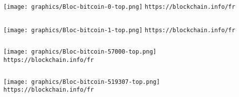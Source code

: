 

\begin{frame}{}

\begin{columns}
\column{\dimexpr\paperwidth-1pt}

\begin{center}
\vskip 1.0cm
\texttt{[image: graphics/Bloc-bitcoin-0-top.png]}
\vskip 0.1cm
{\tiny\texttt{https://blockchain.info/fr}}
\end{center}

\end{columns}

\normalsize
\end{frame}


\begin{frame}{}

\begin{columns}
\column{\dimexpr\paperwidth-1pt}

\begin{center}
\vskip 1.0cm
\texttt{[image: graphics/Bloc-bitcoin-1-top.png]}
\vskip 0.1cm
{\tiny\texttt{https://blockchain.info/fr}}
\end{center}

\end{columns}

\normalsize
\end{frame}


\begin{frame}{}

\begin{columns}
\column{\dimexpr\paperwidth-1pt}

\begin{center}
\vskip 1.0cm
\texttt{[image: graphics/Bloc-bitcoin-57000-top.png]}
\vskip 0.1cm
{\tiny\texttt{https://blockchain.info/fr}}
\end{center}

\end{columns}

\normalsize
\end{frame}


\begin{frame}{}

\begin{columns}
\column{\dimexpr\paperwidth-1pt}

\begin{center}
\vskip 1.0cm
\texttt{[image: graphics/Bloc-bitcoin-519307-top.png]}
\vskip 0.1cm
{\tiny\texttt{https://blockchain.info/fr}}
\end{center}

\end{columns}

\normalsize
\end{frame}

